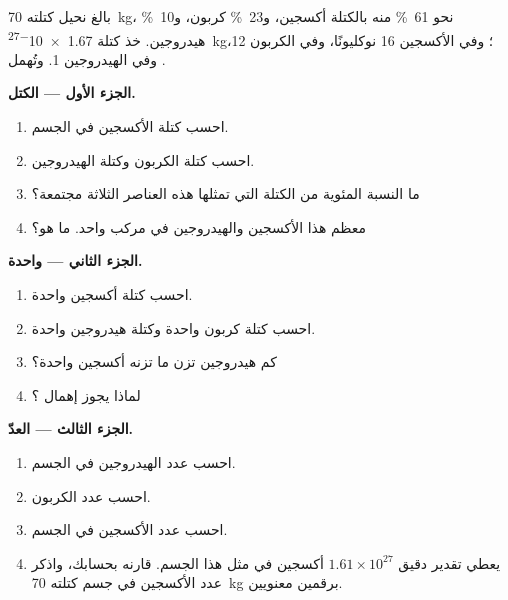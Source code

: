 \begin{problem}
\label{pb:g9:elements-universe-earth:1}
بالغ نحيل كتلته \qty{70}{kg}، نحو \qty{61}{\percent} منه بالكتلة أكسجين،
و\qty{23}{\percent} كربون، و\qty{10}{\percent} هيدروجين. خذ
كتلة  \qty{1.67e-27}{kg}؛ وفي  الأكسجين 16
نوكليونًا، وفي  الكربون 12، وفي  الهيدروجين 1. وتُهمل .

\medskip
\noindent\textbf{الجزء الأول --- الكتل.}
\begin{enumerate}
  \item احسب كتلة الأكسجين في الجسم.
  \item احسب كتلة الكربون وكتلة الهيدروجين.
  \item ما النسبة المئوية من الكتلة التي تمثلها هذه العناصر الثلاثة
        مجتمعة؟
  \item معظم هذا الأكسجين والهيدروجين في مركب واحد. ما هو؟
\end{enumerate}

\medskip
\noindent\textbf{الجزء الثاني ---  واحدة.}
\begin{enumerate}[resume]
  \item احسب كتلة  أكسجين واحدة.
  \item احسب كتلة  كربون واحدة وكتلة  هيدروجين واحدة.
  \item كم  هيدروجين تزن ما تزنه  أكسجين واحدة؟
  \item لماذا يجوز إهمال ؟
\end{enumerate}

\medskip
\noindent\textbf{الجزء الثالث --- العدّ.}
\begin{enumerate}[resume]
  \item احسب عدد  الهيدروجين في الجسم.
  \item احسب عدد  الكربون.
  \item احسب عدد  الأكسجين في الجسم.
  \item يعطي تقدير دقيق $1.61 \times 10^{27}$  أكسجين في مثل هذا
        الجسم. قارنه بحسابك، واذكر عدد  الأكسجين في جسم كتلته
        \qty{70}{kg} برقمين معنويين.
\end{enumerate}
\end{problem}
